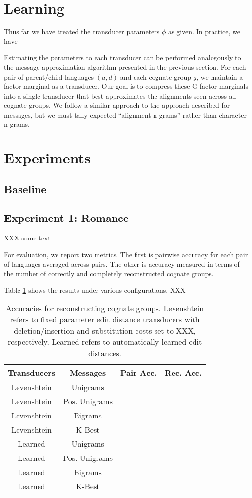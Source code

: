 \documentclass[11pt,a4paper]{article}
\begin{document}
\section{Learning}

Thus far we have treated the transducer parameters $\phi$ as given.
In practice, we have  

Estimating the parameters to each transducer can be performed
analogously to the message approximation algorithm presented in the
previous section. For each pair of parent/child languages $(a,d)$
and each cognate group $g$, we maintain a factor marginal as a
transducer. Our goal is to compress these G factor marginals into
a single transducer that best approximates the alignments seen
across all cognate groups. We follow a similar approach to the
approach described for messages, but we must tally expected ``alignment
n-grams'' rather than character n-grams.

\section{Experiments}

\subsection{Baseline}

\subsection{Experiment 1: Romance}

XXX some text


For evaluation, we report two metrics. The first is pairwise accuracy
for each pair of languages averaged across pairs. The other
is accuracy measured in terms of the number of correctly and
completely reconstructed cognate groups. 

Table \ref{tbl:exp1} shows the results under various configurations. XXX

\begin{table}
  \begin{tabular}{|c|c|c|c|}
    Transducers & Messages & Pair Acc. & Rec. Acc.\\
    \hline
    \hline
    Levenshtein&Unigrams & & \\
    Levenshtein&Pos. Unigrams & & \\
    Levenshtein&Bigrams & & \\
    Levenshtein&K-Best & & \\
    \hline
    Learned&Unigrams & & \\
    Learned&Pos. Unigrams & & \\
    Learned&Bigrams & & \\
    Learned&K-Best & & \\
  \end{tabular}
  \caption{Accuracies for reconstructing cognate groups. Levenshtein
  refers to fixed parameter edit distance transducers with
  deletion/insertion and substitution costs set to XXX, respectively.
  Learned refers to automatically learned edit distances.}
  \label{tbl:exp1}
\end{table}
\end{document}
